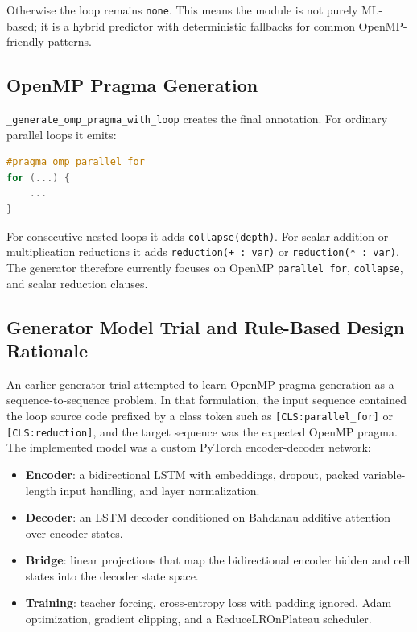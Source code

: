 \documentclass[11pt,a4paper]{article}
\begin{document}
Otherwise the loop remains \texttt{none}. This means the module is not purely
ML-based; it is a hybrid predictor with deterministic fallbacks for common
OpenMP-friendly patterns.

\subsection{OpenMP Pragma Generation}

\texttt{\_generate\_omp\_pragma\_with\_loop} creates the final annotation. For
ordinary parallel loops it emits:

\begin{lstlisting}[language=C]
#pragma omp parallel for
for (...) {
    ...
}
\end{lstlisting}

For consecutive nested loops it adds \texttt{collapse(depth)}. For scalar
addition or multiplication reductions it adds \texttt{reduction(+ : var)} or
\texttt{reduction(* : var)}. The generator therefore currently focuses on
OpenMP \texttt{parallel for}, \texttt{collapse}, and scalar reduction clauses.

\subsection{Generator Model Trial and Rule-Based Design Rationale}

An earlier generator trial attempted to learn OpenMP pragma generation as a
sequence-to-sequence problem. In that formulation, the input sequence contained
the loop source code prefixed by a class token such as
\texttt{[CLS:parallel\_for]} or \texttt{[CLS:reduction]}, and the target
sequence was the expected OpenMP pragma. The implemented model was a custom
PyTorch encoder-decoder network:

\begin{itemize}[leftmargin=*]
  \item \textbf{Encoder}: a bidirectional LSTM with embeddings, dropout, packed
        variable-length input handling, and layer normalization.
  \item \textbf{Decoder}: an LSTM decoder conditioned on Bahdanau additive
        attention over encoder states.
  \item \textbf{Bridge}: linear projections that map the bidirectional encoder
        hidden and cell states into the decoder state space.
  \item \textbf{Training}: teacher forcing, cross-entropy loss with padding
        ignored, Adam optimization, gradient clipping, and a
        ReduceLROnPlateau scheduler.
\end{itemize}
\end{document}
